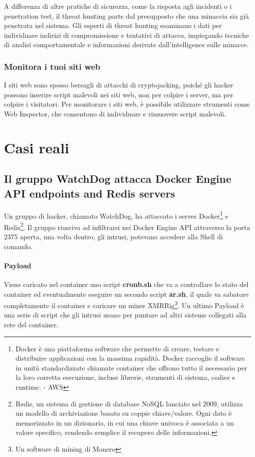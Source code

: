 \documentclass[12pt,a4paper]{article}
\begin{document}
A differenza di altre pratiche di sicurezza, come la risposta agli incidenti o i
penetration test, il threat hunting parte dal presupposto che una minaccia sia
già penetrata nel sistema. Gli esperti di threat hunting esaminano i dati per
individuare indirizi di compromissione e tentativi di attacco, impiegando
tecniche di analisi comportamentale e informazioni derivate dall'intelligence
sulle minacce.

\subsubsection*{Monitora i tuoi siti web}
I siti web sono spesso bersagli di attacchi di cryptojacking, poiché gli hacker
possono inserire script malevoli nei siti web, non per colpire i server, ma per
colpire i visitatori. Per monitorare i siti web, è possibile utilizzare
strumenti come Web Inspector, che consentono di individuare e rimuovere script
malevoli.

\newpage

\section{Casi reali}

\subsection{Il gruppo WatchDog attacca Docker Engine API endpoints and Redis servers}
Un gruppo di hacker, chiamato WatchDog, ha attaccato i server
Docker\footnote{Docker è una piattaforma software che permette di creare,
testare e distribuire applicazioni con la massima rapidità. Docker raccoglie il
software in unità standardizzate chiamate container che offrono tutto il
necessario per la loro corretta esecuzione, incluse librerie, strumenti di
sistema, codice e runtime. - AWS} e Redis\footnote{Redis, un sistema di gestione
di database NoSQL lanciato nel 2009, utilizza un modello di archiviazione basato
su coppie chiave/valore. Ogni dato è memorizzato in un dizionario, in cui una
chiave univoca è associata a un valore specifico, rendendo semplice il recupero
delle informazioni.}. Il gruppo riusciva ad infiltrarsi nei Docker Engine API
attraverso la porta 2375 aperta, una volta dentro, gli intrusi, potevano
accedere alla Shell di comando.

\paragraph{Payload} Viene caricato nel container uno script \textbf{cronb.sh}
che va a controllare lo stato del container ed eventualmente eseguire un secondo
script \textbf{ar.sh}, il quale va sabatore completamente il container e
caricare un miner XMRRig\footnote{Un software di mining di Monero}. Un ultimo
Payload è una serie di script che gli intrusi usano per puntare ad altri sisteme
collegati alla rete del container.\cite{WatchDog}
\end{document}
